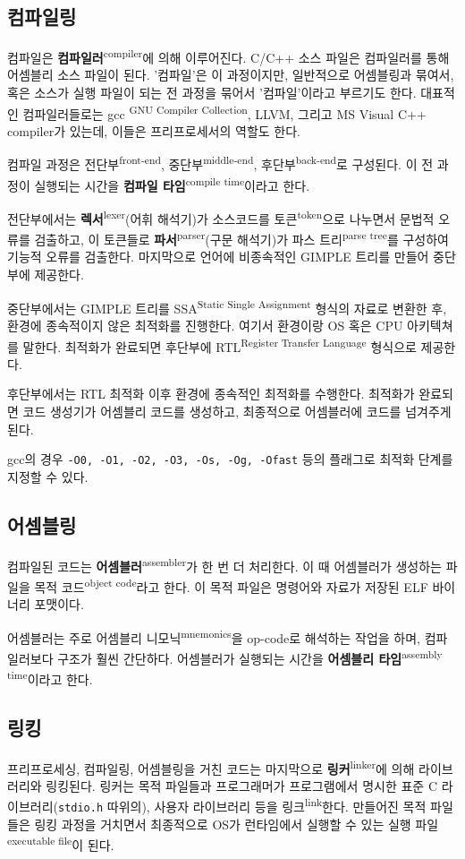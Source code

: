 \documentclass[runningheads]{llncs}
\newcommand{\translation}[1]{\textsuperscript{#1}}
\begin{document}
\subsection{컴파일링}
컴파일은 \textbf{컴파일러}\translation{compiler}에 의해 이루어진다. C/C++ 소스 파일은 컴파일러를 통해 어셈블리 소스 파일이 된다. '컴파일'은 이 과정이지만, 일반적으로 어셈블링과 묶여서, 혹은 소스가 실행 파일이 되는 전 과정을 묶어서 '컴파일'이라고 부르기도 한다. 대표적인 컴파일러들로는 gcc \translation{GNU Compiler Collection}, LLVM, 그리고 MS Visual C++ compiler가 있는데, 이들은 프리프로세서의 역할도 한다.

컴파일 과정은 전단부\translation{front-end}, 중단부\translation{middle-end}, 후단부\translation{back-end}로 구성된다. 이 전 과정이 실행되는 시간을 \textbf{컴파일 타임}\translation{compile time}이라고 한다.

전단부에서는 \textbf{렉서}\translation{lexer}(어휘 해석기)가 소스코드를 토큰\translation{token}으로 나누면서 문법적 오류를 검출하고, 이 토큰들로 \textbf{파서}\translation{parser}(구문 해석기)가 파스 트리\translation{parse tree}를 구성하여 기능적 오류를 검출한다. 마지막으로 언어에 비종속적인 GIMPLE 트리를 만들어 중단부에 제공한다.

중단부에서는 GIMPLE 트리를 SSA\translation{Static Single Assignment} 형식의 자료로 변환한 후, 환경에 종속적이지 않은 최적화를 진행한다. 여기서 환경이랑 OS 혹은 CPU 아키텍쳐를 말한다. 최적화가 완료되면 후단부에 RTL\translation{Register Transfer Language} 형식으로 제공한다.

후단부에서는 RTL 최적화 이후 환경에 종속적인 최적화를 수행한다. 최적화가 완료되면 코드 생성기가 어셈블리 코드를 생성하고, 최종적으로 어셈블러에 코드를 넘겨주게 된다.

gcc의 경우 \texttt{-O0, -O1, -O2, -O3, -Os, -Og, -Ofast} 등의 플래그로 최적화 단계를 지정할 수 있다.

\subsection{어셈블링}
컴파일된 코드는 \textbf{어셈블러}\translation{assembler}가 한 번 더 처리한다. 이 때 어셈블러가 생성하는 파일을 목적 코드\translation{object code}라고 한다. 이 목적 파일은 명령어와 자료가 저장된 ELF 바이너리 포맷이다. 

어셈블러는 주로 어셈블리 니모닉\translation{mnemonics}을 op-code로 해석하는 작업을 하며, 컴파일러보다 구조가 훨씬 간단하다. 어셈블러가 실행되는 시간을 \textbf{어셈블리 타임}\translation{assembly time}이라고 한다.

\subsection{링킹}
프리프로세싱, 컴파일링, 어셈블링을 거친 코드는 마지막으로 \textbf{링커}\translation{linker}에 의해 라이브러리와 링킹된다. 링커는 목적 파일들과 프로그래머가 프로그램에서 명시한 표준 C 라이브러리(\texttt{stdio.h} 따위의), 사용자 라이브러리 등을 링크\translation{link}한다. 만들어진 목적 파일들은 링킹 과정을 거치면서 최종적으로 OS가 런타임에서 실행할 수 있는 실행 파일\translation{executable file}이 된다.
\end{document}
